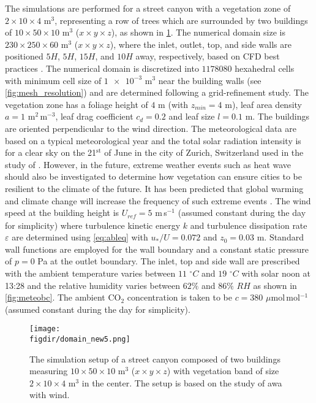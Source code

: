 The simulations are performed for a street canyon with a vegetation zone of $2 \times 10 \times 4$ m$^3$, representing a row of trees which are surrounded by two buildings of $10 \times 50 \times 10$ m$^3$ ($x\times y \times z$), as shown in \cref{fig:domain_new5}. The numerical domain size is $230\times 250 \times 60$ m$^3$  ($x\times y \times z$), where the inlet, outlet, top, and side walls are positioned $5 H$, $5 H$, $15 H$, and $10 H$ away, respectively, based on CFD best practices \citep{Blocken2015, Franke2007, Tominaga2008}. The numerical domain is discretized into $\num{1178080}$ hexahedral cells with minimum cell size of $\num{1e-3}$ m$^{3}$ near the building walls (see \cref{fig:mesh_resolution}) and are determined following a grid-refinement study. The vegetation zone has a foliage height of $4$ m (with $z_{\textit{min}}= 4$ m), leaf area density $a= 1$ m$^2$\,m$^{-3}$, leaf drag coefficient $c_d=0.2$ and leaf size $l=0.1$ m. The buildings are oriented perpendicular to the wind direction. The meteorological data are based on a typical meteorological year and the total solar radiation intensity is for a clear sky on the 21$^{\mathrm{st}}$ of June in the city of Zurich, Switzerland used in the study of \cite{Kubilay2018}. However, in the future, extreme weather events such as heat wave should also be investigated to determine how vegetation can ensure cities to be resilient to the climate of the future. It has been predicted that global warming and climate change will increase the frequency of such extreme events \citep{Mitchell2016}. The wind speed at the building height is $U_{\textit{ref}}=5$ m\,s$^{-1}$ (assumed constant during the day for simplicity) where turbulence kinetic energy $k$ and turbulence dissipation rate $\varepsilon$ are determined using \cref{eq:ableq} \citep{Richards1993} with $u_*/U = 0.072$ and $z_0 = 0.03$ m. Standard wall functions are employed for the wall boundary and a constant static pressure of $p=0$ Pa at the outlet boundary. The inlet, top and side wall are prescribed with the ambient temperature varies between $11$ $^{\circ}C$ and $19$ $^{\circ}C$ with solar noon at 13:28 and the relative humidity varies between $62\%$ and $86\%$ $RH$ as shown in \cref{fig:meteobc}. The ambient CO$_2$ concentration is taken to be $c=380$ $\mu$mol\,mol$^{-1}$ (assumed constant during the day for simplicity).

	\begin{figure}[t]
	\centering
	\texttt{[image: \\figdir/domain\_new5.png]}
	\caption{The simulation setup of a street canyon composed of two buildings measuring $10 \times 50 \times 10$ m$^3$ ($x\times y \times z$) with vegetation band of size $2 \times 10 \times 4$ m$^3$ in the center. The setup is based on the study of \cite{Kubilay2018} awa with wind.}
	\label{fig:domain_new5}
	\end{figure}


